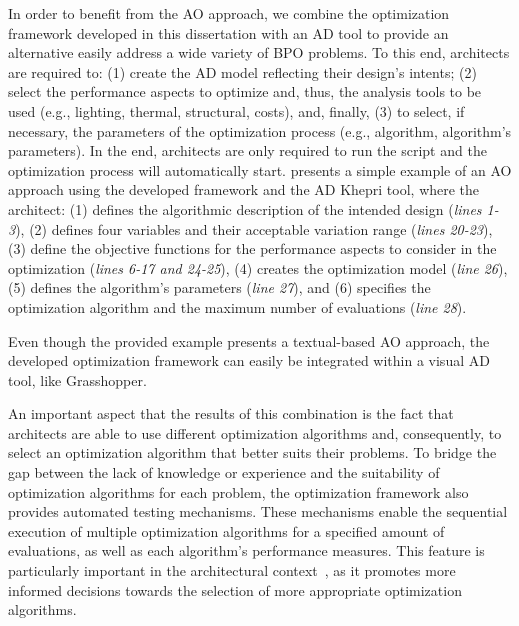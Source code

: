 In order to benefit from the \ac{AO} approach, we combine the optimization framework developed in this dissertation with an \ac{AD} tool to provide an alternative easily address a wide variety of \ac{BPO} problems. To this end, architects are required to: (1) create the \ac{AD} model reflecting their design's intents; (2) select the performance aspects to optimize and, thus, the analysis tools to be used (e.g., lighting, thermal, structural, costs), and, finally, (3) to select, if necessary, the parameters of the optimization process (e.g., algorithm, algorithm's parameters). In the end, architects are only required to run the script and the optimization process will automatically start.  presents a simple example of an \ac{AO} approach using the developed framework and the \ac{AD} Khepri tool, where the architect: (1) defines the algorithmic description of the intended design (\textit{lines 1-3}), (2) defines four variables and their acceptable variation range (\textit{lines 20-23}), (3) define the objective functions for the performance aspects to consider in the optimization (\textit{lines 6-17 and 24-25}), (4) creates the optimization model (\textit{line 26}), (5) defines the algorithm's parameters (\textit{line 27}), and (6) specifies the optimization algorithm and the maximum number of evaluations (\textit{line 28}).

Even though the provided example presents a textual-based \ac{AO} approach, the developed optimization framework can easily be integrated within a visual \ac{AD} tool, like Grasshopper. 

An important aspect that the results of this combination is the fact that architects are able to use different optimization algorithms and, consequently, to select an optimization algorithm that better suits their problems. To bridge the gap between the lack of knowledge or experience and the suitability of optimization algorithms for each problem, the optimization framework also provides automated testing mechanisms. These mechanisms enable the sequential execution of multiple optimization algorithms for a specified amount of evaluations, as well as each algorithm's performance measures. This feature is particularly important in the architectural context~\cite{Wortmann2016BBO,Hamdy2016}, as it promotes more informed decisions towards the selection of more appropriate optimization algorithms.


